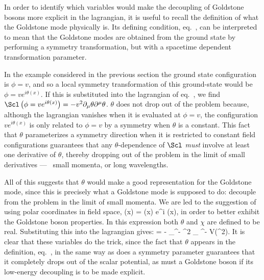 \documentclass[12pt]{report}
\begin{document}
In order to identify which variables would make the
decoupling of Goldstone bosons more explicit in the
lagrangian, it is useful to recall the definition of what
the Goldstone mode physically is. Its defining condition,
eq.~, can be interpreted to mean that the
Goldstone modes are obtained from the ground state by
performing a symmetry transformation, but with a spacetime
dependent transformation parameter.

In the example considered in the previous section the
ground state configuration is $\phi = v$, and so a local
symmetry transformation of this ground-state would be $\phi
= v e^{i 
\theta(x)}$. If this is substituted into the lagrangian of 
eq.~, we find $\Scl \left( \phi = v e^{i
\theta(x)} \right) = - v^2 \partial_\mu \theta \partial^\mu
\theta$. 
$\theta$ does not drop out of the problem because, although
the lagrangian vanishes when it is evaluated at $\phi =v$,
the configuration $v e^{i\theta(x)}$ is only related to
$\phi =v$ by a symmetry when $\theta$ is a constant. This
fact that $\theta$ parameterizes a symmetry direction when
it is restricted to constant field configurations
guarantees that any $\theta$-dependence of $\Scl$ {\em
must} involve at least one derivative of $\theta$, thereby
dropping out of the problem in the limit of small
derivatives --- \ie\ small momenta, or long wavelengths.

All of this suggests that $\theta$ would make a good
representation for the Goldstone mode, since this is
precisely what a Goldstone mode is supposed to do: decouple
from the problem in the limit of small momenta. We are led
to the suggestion of using polar coordinates in field
space, 
%
\eq
\label{polcoords}
\phi(x) = \chi(x) \; e^{i \theta(x)},
\eeq
%
in order to better exhibit the Goldstone boson properties.
In this expression both $\theta$ and $\chi$ are defined to
be real. Substituting this into the lagrangian gives:
%
\eq
\label{linpolcoords}
\Scl = - \partial_\mu \chi \partial^\mu \chi - \chi^2
\partial_\mu \theta
\partial^\mu \theta - V(\chi^2).
\eeq
%
It is clear that these variables do the trick, since the
fact that $\theta$ appears in the definition,
eq.~, in the same way as does a symmetry
parameter guarantees that it completely drops out of the
scalar potential, as must a Goldstone boson if its
low-energy decoupling is to be made explicit.
\end{document}
